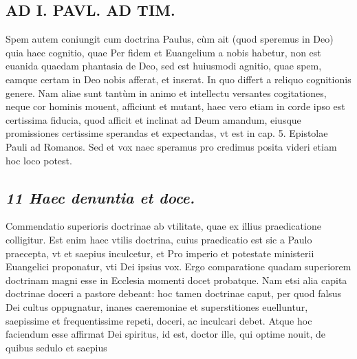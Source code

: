 \documentclass{article}
\begin{document}
\begin{pages}
\section*{AD I. PAVL. AD TIM. }
\marginpar{[ p.226 ]}\pstart Spem autem coniungit cum doctrina Paulus, cùm ait (quod speremus in Deo) quia haec cognitio, quae Per fidem et Euangelium a nobis habetur, non est euanida quaedam phantasia de Deo, sed est huiusmodi agnitio, quae spem, eamque  certam in Deo nobis afferat, et inserat. In quo differt a reliquo cognitionis genere. Nam aliae sunt tantùm in animo et intellectu versantes cogitationes, neque cor hominis mouent, afficiunt et mutant, haec vero etiam in corde ipso est certissima fiducia, quod afficit et inclinat ad Deum amandum, eiusque promissiones certissime sperandas et expectandas, vt est in cap. 5. Epistolae Pauli ad Romanos. Sed et vox naec speramus pro credimus posita videri etiam hoc loco potest.  \pend
{}
{}
\subsection*{\textit{11 Haec denuntia et doce. }}\pstart Commendatio superioris doctrinae ab vtilitate, quae ex illius praedicatione colligitur. Est enim haec vtilis doctrina, cuius praedicatio est sic a Paulo praecepta, vt et saepius inculcetur, et Pro imperio et potestate ministerii Euangelici proponatur, vti Dei ipsius vox. Ergo comparatione quadam superiorem doctrinam magni esse in Ecclesia momenti docet probatque. Nam etsi alia capita doctrinae doceri a pastore debeant: hoc tamen doctrinae caput, per quod falsus Dei cultus oppugnatur, inanes caeremoniae et superstitiones euelluntur, saepissime et frequentissime repeti, doceri, ac inculcari debet. Atque hoc faciendum esse affirmat Dei spiritus, id est, doctor ille, qui optime nouit, de quibus sedulo et saepius  \pend

\end{pages}
\end{document}
